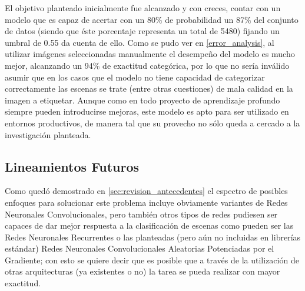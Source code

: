 El objetivo planteado inicialmente fue alcanzado y con creces, contar con un modelo que es capaz de acertar con un 80\% de probabilidad un 87\% del conjunto de datos (siendo que éste porcentaje representa un total de 5480) fijando un umbral de 0.55 da cuenta de ello. Como se pudo ver en \ref{error_analysis}, al utilizar imágenes seleccionadas manualmente el desempeño del modelo es mucho mejor, alcanzando un 94\% de exactitud categórica, por lo que no sería inválido asumir que en los casos que el modelo no tiene capacidad de categorizar correctamente las escenas se trate (entre otras cuestiones) de mala calidad en la imagen a etiquetar. Aunque como en todo proyecto de aprendizaje profundo siempre pueden introducirse mejoras, este modelo es apto para ser utilizado en entornos productivos, de manera tal que su provecho no sólo queda a cercado a la investigación planteada. 


\subsection{Lineamientos Futuros}

Como quedó demostrado en \ref{sec:revision_antecedentes} el espectro de posibles enfoques para solucionar este problema incluye obviamente variantes de Redes Neuronales Convolucionales, pero también otros tipos de redes pudiesen ser capaces de dar mejor respuesta a la clasificación de escenas como pueden ser las Redes Neuronales Recurrentes o las planteadas (pero aún no incluidas en librerías estándar) Redes Neuronales Convolucionales Aleatorias Potenciadas por el Gradiente; con esto se quiere decir que es posible que a través de la utilización de otras arquitecturas (ya existentes o no) la tarea se pueda realizar con mayor exactitud. 

